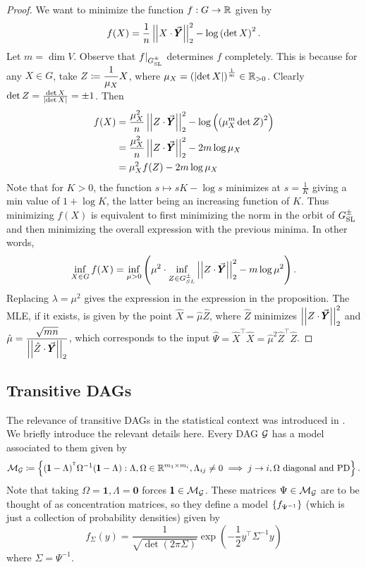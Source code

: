 \begin{proof}
We want to minimize the function $f: G \to \mathbb{R}$ given by $$f(X) = \frac{1}{n} \left|\left| X\cdot \vec{\pmb Y} \right|\right|_2^2 - \log\left(\det X\right)^2.$$
Let $m=\dim V$. Observe that $f|_{G_{\operatorname{SL}}^\pm}$ determines $f$ completely. This is because for any $X\in G$, take $\displaystyle Z \coloneqq \frac{1}{\mu_X} X$, where $\mu_X = \left(\left| \det X \right|\right)^{\frac{1}{m}}\in \mathbb{R}_{>0}$. Clearly $\det Z = \frac{\det X}{\left| \det X \right|} = \pm1$. Then \begin{align*}
f(X) &= \frac{\mu_X^2}{n}\left|\left| Z\cdot \vec{\pmb Y} \right|\right|_2^2 - \log\left( \left(\mu_X^m\det Z\right)^2\right)\\ 
&= \frac{\mu_X^2}{n}\left|\left| Z\cdot \vec{\pmb Y} \right|\right|_2^2 - 2m\log\mu_X\\
&= \mu_X^2 f(Z) - 2m \log \mu_X
\end{align*}
Note that for $K>0$, the function $s \mapsto s K - \log s$ minimizes at $s=\frac{1}{K}$ giving a min value of $1+\log K$, the latter being an increasing function of $K$. Thus minimizing $f(X)$ is equivalent to first minimizing the norm in the orbit of $G_{\operatorname{SL}}^\pm$ and then minimizing the overall expression with the previous minima. In other words,
$$\inf _{X\in G}f(X) = \inf_{\mu>0} \left( \mu^2 \cdot \inf_{Z\in G_{SL}^\pm} \left|\left| Z\cdot\vec{\pmb Y} \right|\right|_2^2 - m\log \mu^2\right) .$$
Replacing $\lambda = \mu^2$ gives the expression in the expression in the proposition. The MLE, if it exists, is given by the point $\hat X = \hat\mu \hat Z$, where $\hat Z$ minimizes $\left|\left| Z\cdot \vec{\pmb Y} \right|\right|_2^2$ and $\displaystyle \hat \mu = \frac{\sqrt {mn}}{\left|\left| \hat Z\cdot \vec{\pmb Y} \right|\right|_2}$, which corresponds to the input $\hat\Psi = \hat X^\intercal \hat X = \hat \mu^2 \hat Z^\intercal \hat Z$.
\hfill\end{proof}


\subsection{Transitive DAGs} 

The relevance of transitive DAGs in the statistical context was introduced in \cite[\S5]{mainpaper}. We briefly introduce the relevant details here. Every DAG ${\mathcal{G}}$ has a model associated to them given by $$\cM_{\cG} \sett  \set{(\pmb1-\Lambda)^\intercal\Omega^{-1}(\pmb1-\Lambda) : \Lambda, \Omega\in \R^{m_1\times m_i}, \Lambda_{ij}\neq 0\implies j\to i, \Omega \text{ diagonal and PD}}.$$ Note that taking $\Omega = \pmb 1, \Lambda=\pmb 0$ forces $\pmb 1\in {\mathcal{M}}_{{\mathcal{G}}}$. These matrices $\Psi\in {\mathcal{M}}_{{\mathcal{G}}}$ are to be thought of as concentration matrices, so they define a model $\left\{f_{\Psi^{-1}}\right\}$ (which is just a collection of probability densities) given by  $$f_{\Sigma}(y) = \frac{1}{\sqrt{\det(2\pi \Sigma)}} \exp\left(-\frac{1}{2}y^\intercal\Sigma^{-1}y\right)$$
where $\Sigma=\Psi^{-1}$. 

